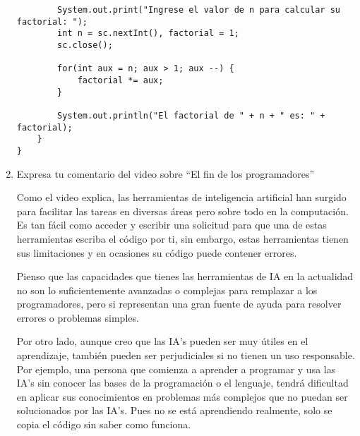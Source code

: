 \documentclass[12pt]{article}
\begin{document}
\begin{enumerate}[leftmargin=*]
\begin{lstlisting}
        System.out.print("Ingrese el valor de n para calcular su factorial: ");
        int n = sc.nextInt(), factorial = 1;
        sc.close();

        for(int aux = n; aux > 1; aux --) {
            factorial *= aux;
        }

        System.out.println("El factorial de " + n + " es: " + factorial);
    }
}
        \end{lstlisting}

        \item Expresa tu comentario del video sobre “El fin de los programadores”
        
        Como el video explica, las herramientas de inteligencia artificial han surgido para facilitar las tareas en diversas áreas pero sobre todo en la computación. Es tan fácil como acceder y escribir una solicitud para que una de estas herramientas escriba el código por ti, sin embargo, estas herramientas tienen sus limitaciones y en ocasiones su código puede contener errores. 

        Pienso que las capacidades que tienes las herramientas de IA en la actualidad no son lo suficientemente avanzadas o complejas para remplazar a los programadores, pero si representan una gran fuente de ayuda para resolver errores o problemas simples. 

        Por otro lado, aunque creo que las IA's pueden ser muy útiles en el aprendizaje, también pueden ser perjudiciales si no tienen un uso responsable. Por ejemplo, una persona que comienza a aprender a programar y usa las IA's sin conocer las bases de la programación o el lenguaje, tendrá dificultad en aplicar sus conocimientos en problemas más complejos que no puedan ser solucionados por las IA's. Pues no se está aprendiendo realmente, solo se copia el código sin saber como funciona.  
    \end{enumerate}
\end{document}
